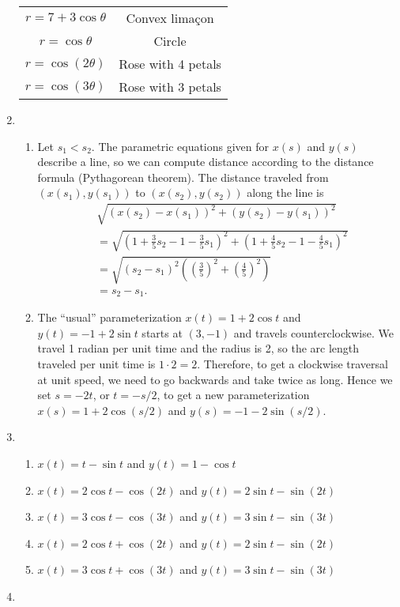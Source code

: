 \begin{enumerate}
\begin{table}[H]
\begin{tabular}{cc}
$r = 7 + 3\cos\theta$ & Convex lima\c{c}on \\
$r = \cos\theta$ & Circle \\
$r = \cos(2\theta)$ & Rose with 4 petals \\
$r = \cos(3\theta)$ & Rose with 3 petals
\end{tabular}
\endgroup
\end{table}
\item \begin{enumerate}
\item Let $s_1 < s_2$. The parametric equations given for $x(s)$ and $y(s)$ describe a line, so we can compute distance according to the distance formula (Pythagorean theorem). The distance traveled from $(x(s_1), y(s_1))$ to $(x(s_2), y(s_2))$ along the line is
\begin{align*}
& \sqrt{(x(s_2) - x(s_1))^2 + (y(s_2) - y(s_1))^2} \\
&= \sqrt{\left(1 + \frac{3}{5}s_2 - 1 - \frac{3}{5}s_1\right)^2 + \left(1 + \frac{4}{5}s_2 - 1 - \frac{4}{5}s_1\right)^2} \\
&= \sqrt{(s_2 - s_1)^2\left(\left(\frac{3}{5}\right)^2 + \left(\frac{4}{5}\right)^2\right)} \\
&= s_2 - s_1.
\end{align*}
\item The ``usual'' parameterization $x(t) = 1 + 2\cos t$ and $y(t) = -1 + 2\sin t$ starts at $(3,-1)$ and travels counterclockwise. We travel 1 radian per unit time and the radius is 2, so the arc length traveled per unit time is $1\cdot 2 = 2$. Therefore, to get a clockwise traversal at unit speed, we need to go backwards and take twice as long. Hence we set $s = -2t$, or $t = -s/2$, to get a new parameterization $x(s) = 1 + 2\cos(s/2)$ and $y(s) = -1 - 2\sin(s/2)$.
\end{enumerate}
\item \begin{enumerate}
\item $x(t) = t - \sin t$ and $y(t) = 1 - \cos t$
\item $x(t) = 2\cos t - \cos(2t)$ and $y(t) = 2\sin t - \sin(2t)$
\item $x(t) = 3\cos t - \cos(3t)$ and $y(t) = 3\sin t - \sin(3t)$
\item $x(t) = 2\cos t + \cos(2t)$ and $y(t) = 2\sin t - \sin(2t)$
\item $x(t) = 3\cos t + \cos(3t)$ and $y(t) = 3\sin t - \sin(3t)$
\end{enumerate}
\item \begin{enumerate}

\end{enumerate}
\end{enumerate}

